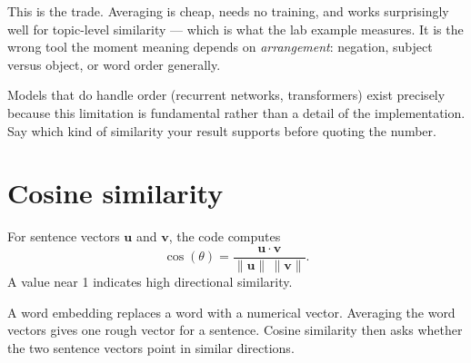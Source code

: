 \begin{keyidea}
This is the  trade. Averaging is cheap, needs no training, and works surprisingly well for topic-level similarity --- which is what the lab example measures. It is the wrong tool the moment meaning depends on \emph{arrangement}: negation, subject versus object, or word order generally.

Models that do handle order (recurrent networks, transformers) exist precisely because this limitation is fundamental rather than a detail of the implementation. Say which kind of similarity your result supports before quoting the number.
\end{keyidea}

\section{Cosine similarity}

For sentence vectors \(\mathbf{u}\) and \(\mathbf{v}\), the code computes
\[
\cos(\theta)=\frac{\mathbf{u}\cdot\mathbf{v}}
{\|\mathbf{u}\|\,\|\mathbf{v}\|}.
\]
A value near 1 indicates high directional similarity.

\begin{intuition}
A word embedding replaces a word with a numerical vector. Averaging the word vectors gives one rough vector for a sentence. Cosine similarity then asks whether the two sentence vectors point in similar directions.
\end{intuition}

\begin{mlfigure}
\end{mlfigure}

